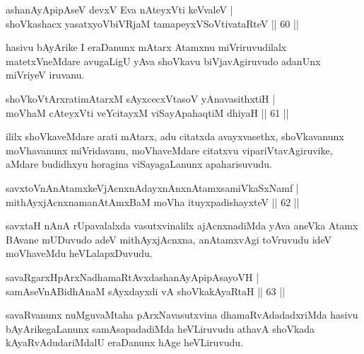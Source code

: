 \begin{shl}
ashanAyApipAseV devxV Eva nAteyxVti keVvaleV |\\
shoVkashacx yasatxyoVbiVRjaM tamapeyxVSoV\s tivataRteV \hfill || 60 ||
\end{shl}

\begin{artha}
hasivu bAyArike I eraDanunx mAtarx Atamxnu miVriruvudilalx matetxVneMdare avugaLigU yAva shoVkavu biVjavAgiruvudo adanUnx miVriyeV iruvanu.
\end{artha}


\begin{shl}
shoVkoV\s tArxratimAtarxM sAyxcecxVtasoV yA\s navasithxtiH |\\
moVhaM cAteyxVti veYcitayxM viSayApahaqtiM dhiyaH \hfill || 61 ||
\end{shl}

\begin{artha}%
ililx shoVkaveMdare arati mAtarx, adu citatxda avayxvasethx, shoVkavanunx moVhavanunx miVridavanu, moVhaveMdare citatxvu vipariVtavAgiruvike, aMdare budidhxyu horagina viSayagaLanunx apaharisuvudu.
\end{artha}

\begin{shl}
savxtoV\s nAnAtamxkeV\s jAcnxnAdayxnAnxnAtamxsamiVkaSxNamf |\\
mithAyxjAcnxnamanAtAmxBaM moVha ituyxpadishayxteV \hfill || 62 ||
\end{shl}

\begin{artha}
savxtaH nAnA rUpavalalxda vasutxvinalilx ajAcnxnadiMda yAva aneVka Atamx BAvane mUDuvudo adeV mithAyxjAcnxna, anAtamxvAgi toVruvudu ideV moVhaveMdu heVLalapxDuvudu.
\end{artha}


\begin{shl}
savaRgarxHpArxNadhamaRtAvxdashanAyApipAsayoVH |\\
samAseVnABidhAnaM sAyxdayxdi vA shoVkakAyaRtaH \hfill || 63 ||
\end{shl}

\begin{artha}
savaRvanunx nuMguvaMtaha pArxNavasutxvina dhamaRvAdadadxriMda hasivu  bAyArikegaLanunx samAsapadadiMda heVLiruvudu athavA shoVkada kAyaRvAdudariMdalU eraDanunx hAge heVLiruvudu.
\end{artha}

